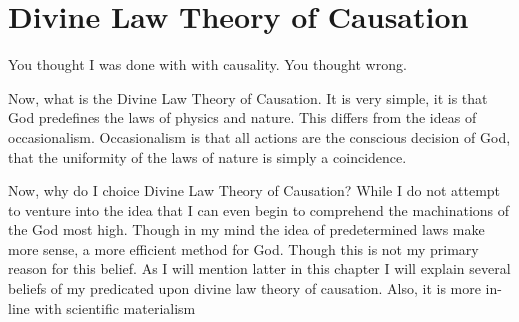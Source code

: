\section{Divine Law Theory of Causation}
\par You thought I was done with with causality. You thought wrong. 
\par Now, what is the Divine Law Theory of Causation. It is very simple, it is that God predefines the laws of physics and nature. This differs from the ideas of occasionalism. Occasionalism is that all actions are the conscious decision of God, that the uniformity of the laws of nature is simply a coincidence. 
\par Now, why do I choice Divine Law Theory of Causation? While I do not attempt to venture into the idea that I can even begin to comprehend the machinations of the God most high. Though in my mind the idea of predetermined laws make more sense, a more efficient method for God. Though this is not my primary reason for this belief. As I will mention latter in this chapter I will explain several beliefs of my predicated upon divine law theory of causation. Also, it is more in-line with scientific materialism
